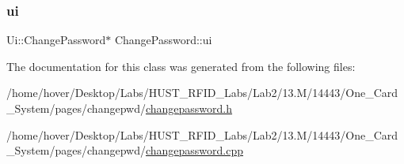\subsubsection{\texorpdfstring{ui}{ui}}
{\footnotesize\ttfamily Ui\+::\+Change\+Password$\ast$ Change\+Password\+::ui\hspace{0.3cm}{\ttfamily [private]}}



The documentation for this class was generated from the following files\+:\begin{DoxyCompactItemize}
\item 
/home/hover/\+Desktop/\+Labs/\+H\+U\+S\+T\+\_\+\+R\+F\+I\+D\+\_\+\+Labs/\+Lab2/13.\+M/14443/\+One\+\_\+\+Card\+\_\+\+System/pages/changepwd/\mbox{\hyperlink{changepassword_8h}{changepassword.\+h}}\item 
/home/hover/\+Desktop/\+Labs/\+H\+U\+S\+T\+\_\+\+R\+F\+I\+D\+\_\+\+Labs/\+Lab2/13.\+M/14443/\+One\+\_\+\+Card\+\_\+\+System/pages/changepwd/\mbox{\hyperlink{changepassword_8cpp}{changepassword.\+cpp}}\end{DoxyCompactItemize}
